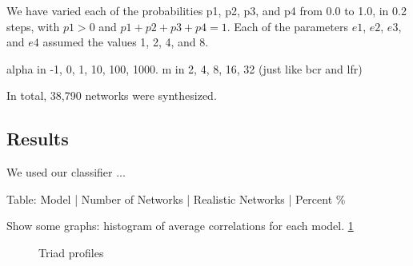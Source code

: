 We have varied each of the probabilities p1, p2, p3, and p4 from 0.0 to 1.0, in
0.2 steps, with $p1 > 0$ and $p1 + p2 + p3 + p4 = 1$. Each of the parameters
$e1$, $e2$, $e3$, and $e4$ assumed the values 1, 2, 4, and 8.


alpha in -1, 0, 1, 10, 100, 1000. 
m in 2, 4, 8, 16, 32 (just like bcr and lfr)

In total, 38,790 networks were synthesized.

\subsection{Results}

We used our classifier ...

Table: Model | Number of Networks | Realistic Networks | Percent \%

Show some graphs: histogram of average correlations for each model.
\ref{fig:histograms}


\begin{figure}[!t]
\center




\caption{Triad profiles}
\label{fig:histograms}
\end{figure}


